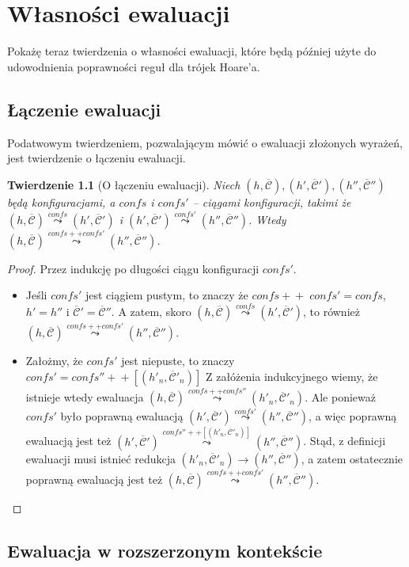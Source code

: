 \documentclass[]{pracamgr}
\renewcommand \| {\hspace{0.75em} | \hspace{0.75em} }
\renewcommand \[ {[\![}
\renewcommand \] {]\!]}
\newcommand \eval [1] {\overset{#1}{\leadsto}}
\newcommand \concat {+\!\!\!+}
\newtheorem{theorem}{Twierdzenie}
\theoremstyle{definition}
\newcommand{\ctxt}{\mathcal{C}\xspace}
\newcommand{\ctxts}{\overline{\ctxt}}
\begin{document}
\chapter{Własności ewaluacji}
Pokażę teraz twierdzenia o własności ewaluacji, które będą później użyte do udowodnienia poprawności reguł dla trójek Hoare'a.
\section{Łączenie ewaluacji}
Podatwowym twierdzeniem, pozwalającym mówić o ewaluacji złożonych wyrażeń, jest twierdzenie o łączeniu ewaluacji.
\begin{theorem}[O łączeniu ewaluacji]
\label{th:eval_join}
Niech $(h, \ctxts), (h', \ctxts'), (h'', \ctxts'')$ będą konfiguracjami, a $confs$ i $confs'$ -- ciągami konfiguracji,
takimi że $(h, \ctxts) \eval{confs} (h', \ctxts')$ i $(h', \ctxts') \eval{confs'} (h'', \ctxts'')$.
Wtedy $(h, \ctxts) \eval{confs ++ confs'} (h'', \ctxts'')$.
\end{theorem}
\begin{proof}
Przez indukcję po długości ciągu konfiguracji $confs'$.
\begin{itemize}
 \item Jeśli $confs'$ jest ciągiem pustym, to znaczy że $confs \concat\; confs' = confs$,
 $h' = h''$ i $\ctxts' = \ctxts''$. A zatem, skoro $(h, \ctxts) \eval{confs} (h', \ctxts')$,
 to również $(h, \ctxts) \eval{confs ++ confs'} (h'', \ctxts'')$.
 \item Założmy, że $confs'$ jest niepuste, to znaczy $confs' = confs'' \concat [ (h'_n, \ctxts'_n) ]$
 Z załóżenia indukcyjnego wiemy, że istnieje wtedy ewaluacja
 $(h, \ctxts) \eval{confs ++ confs''} (h'_n, \ctxts'_n)$.
 Ale ponieważ $confs'$ było poprawną ewaluacją $(h', \ctxts') \eval{confs'} (h'', \ctxts'')$, a więc
 poprawną ewaluacją jest też
 $(h', \ctxts') \eval{confs'' ++ [(h'_n, \ctxts'_n)]} (h'', \ctxts'')$.
 Stąd, z definicji ewaluacji musi istnieć redukcja $(h'_n, \ctxts'_n) \rightarrow (h'', \ctxts'')$,
 a zatem ostatecznie poprawną ewaluacją jest też $(h, \ctxts) \eval{confs ++ confs'} (h'', \ctxts'')$.
\end{itemize}

\end{proof}

\section{Ewaluacja w rozszerzonym kontekście}
\end{document}
